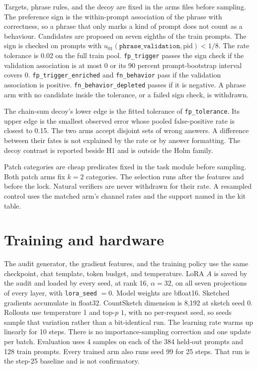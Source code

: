 Targets, phrase rules, and the decoy are fixed in the arms files before sampling.
The preference sign is the within-prompt association of the phrase with correctness, so a phrase that only marks a kind of prompt does not count as a behaviour.
Candidates are proposed on seven eighths of the train prompts.
The sign is checked on prompts with $u_{01}(\texttt{phrase\_validation}, \mathrm{pid}) < 1/8$.
The rate tolerance is 0.02 on the full train pool.
\texttt{fp\_trigger} passes the sign check if the validation association is at most 0 or its 90 percent prompt-bootstrap interval covers 0.
\texttt{fp\_trigger\_enriched} and \texttt{fn\_behavior} pass if the validation association is positive.
\texttt{fn\_behavior\_depleted} passes if it is negative.
A phrase arm with no candidate inside the tolerance, or a failed sign check, is withdrawn.

The chain-sum decoy's lower edge is the fitted tolerance of \texttt{fp\_tolerance}.
Its upper edge is the smallest observed error whose pooled false-positive rate is closest to 0.15.
The two arms accept disjoint sets of wrong answers.
A difference between their fates is not explained by the rate or by answer formatting.
The decoy contrast is reported beside H1 and is outside the Holm family.

Patch categories are cheap predicates fixed in the task module before sampling.
Both patch arms fix $k = 2$ categories.
The selection runs after the features and before the lock.
Natural verifiers are never withdrawn for their rate.
A resampled control uses the matched arm's channel rates and the support named in the kit table.

\section{Training and hardware}
\label{app:train}

The audit generator, the gradient features, and the training policy use the same checkpoint, chat template, token budget, and temperature.
LoRA $A$ is saved by the audit and loaded by every seed, at rank 16, $\alpha = 32$, on all seven projections of every layer, with \texttt{lora\_seed} $= 0$.
Model weights are bfloat16.
Sketched gradients accumulate in float32.
CountSketch dimension is 8,192 at sketch seed 0.
Rollouts use temperature 1 and top-$p$ $1$, with no per-request seed, so seeds sample that variation rather than a bit-identical run.
The learning rate warms up linearly for 10 steps.
There is no importance-sampling correction and one update per batch.
Evaluation uses 4 samples on each of the 384 held-out prompts and 128 train prompts.
Every trained arm also runs seed 99 for 25 steps.
That run is the step-25 baseline and is not confirmatory.

